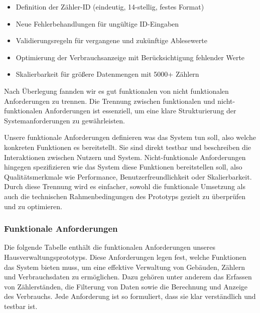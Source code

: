 \begin{itemize}
    \item Definition der Zähler-ID (eindeutig, 14-stellig, festes Format)
    \item Neue Fehlerbehandlungen für ungültige ID-Eingaben
    \item Validierungsregeln für vergangene und zukünftige Ablesewerte
    \item Optimierung der Verbrauchsanzeige mit Berücksichtigung fehlender Werte 
    \item Skalierbarkeit für größere Datenmengen mit 5000+ Zählern 
\end{itemize}

Nach Überlegung fannden wir es gut funktionalen von nicht funktionalen Anforderungen zu trennen. Die Trennung zwischen funktionalen und nicht-funktionalen Anforderungen ist essenziell, um eine klare Strukturierung der Systemanforderungen zu gewährleisten. \par
Unsere funktionale Anforderungen definieren was das System tun soll, also welche konkreten Funktionen es bereitstellt. Sie sind direkt testbar und beschreiben die Interaktionen zwischen Nutzern und System.
Nicht-funktionale Anforderungen hingegen spezifizieren wie das System diese Funktionen bereitstellen soll, also Qualitätsmerkmale wie Performance, Benutzerfreundlichkeit oder Skalierbarkeit.
Durch diese Trennung wird es einfacher, sowohl die funktionale Umsetzung als auch die technischen Rahmenbedingungen des Prototyps gezielt zu überprüfen und zu optimieren. \par

\footnotesize

\subsubsection{Funktionale Anforderungen}

Die folgende Tabelle enthält die funktionalen Anforderungen unseres Hausverwaltungsprototyps.
Diese Anforderungen legen fest, welche Funktionen das System bieten muss, um eine effektive Verwaltung von Gebäuden, Zählern und Verbrauchsdaten zu ermöglichen.
Dazu gehören unter anderem das Erfassen von Zählerständen, die Filterung von Daten sowie die Berechnung und Anzeige des Verbrauchs.
Jede Anforderung ist so formuliert, dass sie klar verständlich und testbar ist.\par

